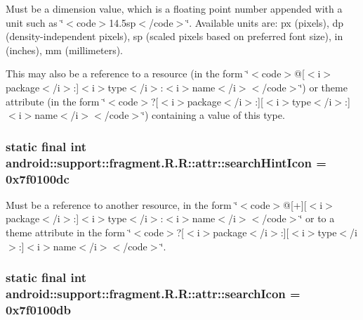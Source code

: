 Must be a dimension value, which is a floating point number appended with a unit such as \char`\"{}$<$code$>$14.5sp$<$/code$>$\char`\"{}. Available units are: px (pixels), dp (density-independent pixels), sp (scaled pixels based on preferred font size), in (inches), mm (millimeters). 

This may also be a reference to a resource (in the form \char`\"{}$<$code$>$@\mbox{[}$<$i$>$package$<$/i$>$:\mbox{]}$<$i$>$type$<$/i$>$:$<$i$>$name$<$/i$>$$<$/code$>$\char`\"{}) or theme attribute (in the form \char`\"{}$<$code$>$?\mbox{[}$<$i$>$package$<$/i$>$:\mbox{]}\mbox{[}$<$i$>$type$<$/i$>$:\mbox{]}$<$i$>$name$<$/i$>$$<$/code$>$\char`\"{}) containing a value of this type. \hypertarget{classandroid_1_1support_1_1fragment_1_1_r_1_1attr_7e4a41056d55c764af708b8c78bf32ad}{
\subsubsection[{searchHintIcon}]{\setlength{\rightskip}{0pt plus 5cm}static final int android::support::fragment.R.R::attr::searchHintIcon = 0x7f0100dc}}
\label{classandroid_1_1support_1_1fragment_1_1_r_1_1attr_7e4a41056d55c764af708b8c78bf32ad}


Must be a reference to another resource, in the form \char`\"{}$<$code$>$@\mbox{[}+\mbox{]}\mbox{[}$<$i$>$package$<$/i$>$:\mbox{]}$<$i$>$type$<$/i$>$:$<$i$>$name$<$/i$>$$<$/code$>$\char`\"{} or to a theme attribute in the form \char`\"{}$<$code$>$?\mbox{[}$<$i$>$package$<$/i$>$:\mbox{]}\mbox{[}$<$i$>$type$<$/i$>$:\mbox{]}$<$i$>$name$<$/i$>$$<$/code$>$\char`\"{}. \hypertarget{classandroid_1_1support_1_1fragment_1_1_r_1_1attr_5030a50d2d3369c3158b36ec23f54499}{
\subsubsection[{searchIcon}]{\setlength{\rightskip}{0pt plus 5cm}static final int android::support::fragment.R.R::attr::searchIcon = 0x7f0100db}}
\label{classandroid_1_1support_1_1fragment_1_1_r_1_1attr_5030a50d2d3369c3158b36ec23f54499}



